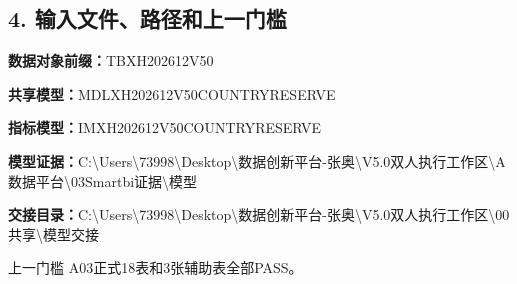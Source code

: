 \documentclass[UTF8,openany,zihao=-4]{ctexbook}
\renewcommand{\_}{\textunderscore\allowbreak}
\begin{document}
\subsection*{4. 输入文件、路径和上一门槛}
\noindent\textbf{数据对象前缀：}{\promptlatin\promptcjk\small TB\_\allowbreak{}XH202612\_\allowbreak{}V50\_\allowbreak{}}\par
\noindent\textbf{共享模型：}{\promptlatin\promptcjk\small MDL\_\allowbreak{}XH202612\_\allowbreak{}V50\_\allowbreak{}COUNTRY\_\allowbreak{}RESERVE}\par
\noindent\textbf{指标模型：}{\promptlatin\promptcjk\small IM\_\allowbreak{}XH202612\_\allowbreak{}V50\_\allowbreak{}COUNTRY\_\allowbreak{}RESERVE}\par
\noindent\textbf{模型证据：}{\promptlatin\promptcjk\small C:\textbackslash{}\allowbreak{}Users\textbackslash{}\allowbreak{}73998\textbackslash{}\allowbreak{}Desktop\textbackslash{}\allowbreak{}数据创新平台-\allowbreak{}张奥\textbackslash{}\allowbreak{}V5.0\_\allowbreak{}双人执行工作区\textbackslash{}\allowbreak{}A\_\allowbreak{}数据平台\textbackslash{}\allowbreak{}03\_\allowbreak{}Smartbi证据\textbackslash{}\allowbreak{}模型}\par
\noindent\textbf{交接目录：}{\promptlatin\promptcjk\small C:\textbackslash{}\allowbreak{}Users\textbackslash{}\allowbreak{}73998\textbackslash{}\allowbreak{}Desktop\textbackslash{}\allowbreak{}数据创新平台-\allowbreak{}张奥\textbackslash{}\allowbreak{}V5.0\_\allowbreak{}双人执行工作区\textbackslash{}\allowbreak{}00\_\allowbreak{}共享\textbackslash{}\allowbreak{}模型交接}\par
\begin{gatebox}{上一门槛}
A03正式18表和3张辅助表全部PASS。

\end{gatebox}
\end{document}
